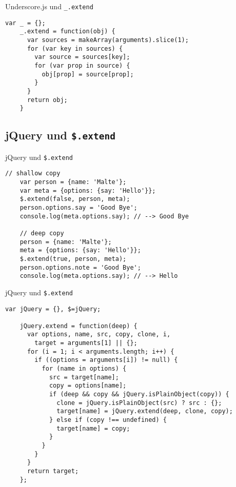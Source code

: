 \begin{frame}[fragile]{Underscore.js und \texttt{\_.extend}}
  \begin{lstlisting}[basicstyle=\ttfamily,gobble=4]
    var _ = {};
    _.extend = function(obj) {
      var sources = makeArray(arguments).slice(1);
      for (var key in sources) {
        var source = sources[key];
        for (var prop in source) {
          obj[prop] = source[prop];
        }
      }
      return obj;
    }
  \end{lstlisting}
\end{frame}

\subsection{jQuery und \texttt{\$.extend}}

\begin{frame}[fragile]{jQuery und \texttt{\$.extend}}
  \begin{lstlisting}[gobble=4]
    // shallow copy
    var person = {name: 'Malte'};
    var meta = {options: {say: 'Hello'}};
    $.extend(false, person, meta);
    person.options.say = 'Good Bye';
    console.log(meta.options.say); // --> Good Bye
    
    // deep copy
    person = {name: 'Malte'};
    meta = {options: {say: 'Hello'}};
    $.extend(true, person, meta);
    person.options.note = 'Good Bye';
    console.log(meta.options.say); // --> Hello
  \end{lstlisting}
\end{frame}

\begin{frame}[fragile]{jQuery und \texttt{\$.extend}}
  \begin{lstlisting}[gobble=4]
    var jQuery = {}, $=jQuery;
    
    jQuery.extend = function(deep) {
      var options, name, src, copy, clone, i,
        target = arguments[1] || {};    
      for (i = 1; i < arguments.length; i++) {
        if ((options = arguments[i]) != null) {
          for (name in options) {
            src = target[name];
            copy = options[name];
            if (deep && copy && jQuery.isPlainObject(copy)) {
              clone = jQuery.isPlainObject(src) ? src : {};
              target[name] = jQuery.extend(deep, clone, copy);
            } else if (copy !== undefined) {
              target[name] = copy;
            }
          }
        }
      }
      return target;
    };
  \end{lstlisting}
\end{frame}

